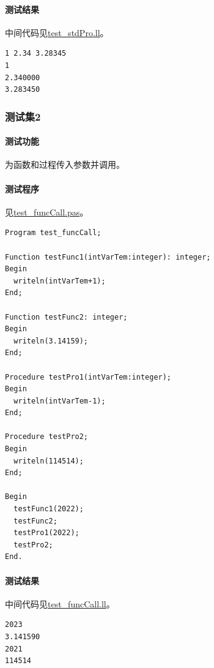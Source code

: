 \documentclass[lang=cn,11pt,a4paper,cite=authornum]{paper}
\begin{document}
\paragraph{测试结果} 中间代码见\href{run:../test/test_stdPro.ll}{test\_stdPro.ll}。

\begin{code}
\begin{verbatim}
1 2.34 3.28345
1
2.340000
3.283450
\end{verbatim}
\end{code}

\subsubsection{测试集2}

\paragraph{测试功能} 为函数和过程传入参数并调用。

\paragraph{测试程序} 见\href{run:../test/test_funcCall.pas}{test\_funcCall.pas}。

\begin{code}
\begin{verbatim}
Program test_funcCall;

Function testFunc1(intVarTem:integer): integer;
Begin
  writeln(intVarTem+1);
End;

Function testFunc2: integer;
Begin
  writeln(3.14159);
End;

Procedure testPro1(intVarTem:integer);
Begin
  writeln(intVarTem-1);
End;

Procedure testPro2;
Begin
  writeln(114514);
End;

Begin
  testFunc1(2022);
  testFunc2;
  testPro1(2022);
  testPro2;
End.
\end{verbatim}
\end{code}

\paragraph{测试结果} 中间代码见\href{run:../test/test_funcCall.ll}{test\_funcCall.ll}。

\begin{code}
\begin{verbatim}
2023
3.141590
2021
114514
\end{verbatim}
\end{code}
\end{document}
